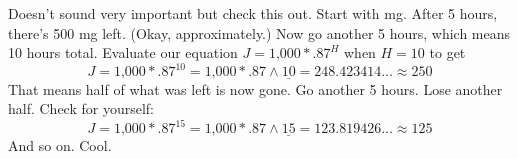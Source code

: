 Doesn't sound very important but check this out.  Start with  mg.  After 5 hours, there's 500 mg left.  (Okay, approximately.)  Now go another 5 hours, which means 10 hours total.  Evaluate our equation $J = \text{1,000} \ast .87^H$ when $H =10$ to get
 $$ J = \text{1,000} \ast .87^{10} = \text{1,000} \ast .87 \wedge \underline{10} = 248.423414\ldots \approx 250$$ 
That means half of what was left is now gone.  Go another 5 hours. Lose another half. Check for yourself:
$$ J = \text{1,000} \ast .87^{15} = \text{1,000} \ast .87 \wedge \underline{15} = 123.819426\ldots \approx 125$$ 
And so on.  Cool.


%